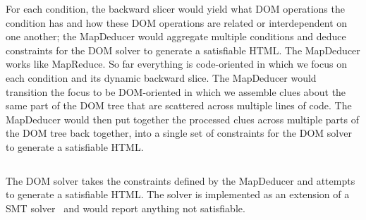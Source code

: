 For each condition, the backward slicer would yield what DOM operations the condition has and how these DOM operations are related or interdependent on one another; the MapDeducer would aggregate multiple conditions and deduce constraints for the DOM solver to generate a satisfiable HTML.  
The MapDeducer works like MapReduce.  So far everything is code-oriented in which we focus on each condition and its dynamic backward slice.  The MapDeducer would transition the focus to be DOM-oriented in which we assemble clues about the same part of the DOM tree that are scattered across multiple lines of code.  
The MapDeducer would then put together the processed clues across multiple parts of the DOM tree back together, into a single set of constraints for the DOM solver to generate a satisfiable HTML.  


\begin{figure}
\begin{lstlisting}[caption=Example showing DOM constraints deduced from dynamic trace and dynamic slice.,label=constraints]  
\end{lstlisting}
\end{figure}


The DOM solver takes the constraints defined by the MapDeducer and attempts to generate a satisfiable HTML.  The solver is implemented as an extension of a SMT solver~\cite{cvc3} and would report anything not satisfiable.  
% 

	





